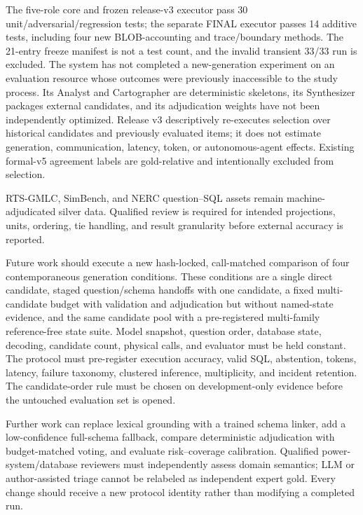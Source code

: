 \documentclass[applsci,article,submit,moreauthors]{Definitions/mdpi}
\begin{document}
The five-role core and frozen release-v3 executor pass 30 unit/adversarial/regression tests; the separate FINAL executor passes 14 additive tests, including four new BLOB-accounting and trace/boundary methods. The 21-entry freeze manifest is not a test count, and the invalid transient 33/33 run is excluded. The system has not completed a new-generation experiment on an evaluation resource whose outcomes were previously inaccessible to the study process. Its Analyst and Cartographer are deterministic skeletons, its Synthesizer packages external candidates, and its adjudication weights have not been independently optimized. Release v3 descriptively re-executes selection over historical candidates and previously evaluated items; it does not estimate generation, communication, latency, token, or autonomous-agent effects. Existing formal-v5 agreement labels are gold-relative and intentionally excluded from selection.

RTS-GMLC, SimBench, and NERC question--SQL assets remain machine-adjudicated silver data. Qualified review is required for intended projections, units, ordering, tie handling, and result granularity before external accuracy is reported.

Future work should execute a new hash-locked, call-matched comparison of four contemporaneous generation conditions. These conditions are a single direct candidate, staged question/schema handoffs with one candidate, a fixed multi-candidate budget with validation and adjudication but without named-state evidence, and the same candidate pool with a pre-registered multi-family reference-free state suite. Model snapshot, question order, database state, decoding, candidate count, physical calls, and evaluator must be held constant. The protocol must pre-register execution accuracy, valid SQL, abstention, tokens, latency, failure taxonomy, clustered inference, multiplicity, and incident retention. The candidate-order rule must be chosen on development-only evidence before the untouched evaluation set is opened.

Further work can replace lexical grounding with a trained schema linker, add a low-confidence full-schema fallback, compare deterministic adjudication with budget-matched voting, and evaluate risk--coverage calibration. Qualified power-system/database reviewers must independently assess domain semantics; LLM or author-assisted triage cannot be relabeled as independent expert gold. Every change should receive a new protocol identity rather than modifying a completed run.
\end{document}
